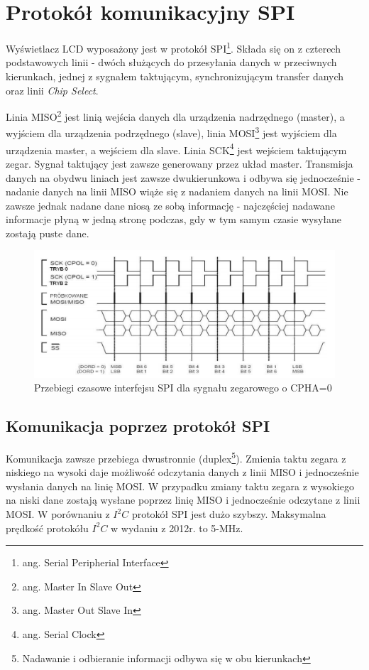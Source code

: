 \documentclass{xmgr}
\begin{document}
\section{Protokół komunikacyjny SPI}
Wyświetlacz LCD wyposażony jest w protokół SPI\footnote{ang. Serial Peripherial Interface}. Składa się on z czterech podstawowych linii - dwóch służących do przesyłania danych w przeciwnych kierunkach, jednej z sygnałem taktującym, synchronizującym transfer danych oraz linii \emph{Chip Select}. 

Linia MISO\footnote{ang. Master In Slave Out} jest linią wejścia danych dla urządzenia nadrzędnego (master), a wyjściem dla urządzenia podrzędnego (slave), linia MOSI\footnote{ang. Master Out Slave In} jest wyjściem dla urządzenia master, a wejściem dla slave. Linia SCK\footnote{ang. Serial Clock} jest wejściem taktującym zegar. Sygnał taktujący jest zawsze generowany przez układ master. Transmisja danych na obydwu liniach jest zawsze dwukierunkowa i odbywa się jednocześnie - nadanie danych na linii MISO wiąże się z nadaniem danych na linii MOSI. Nie zawsze jednak nadane dane niosą ze sobą informację - najczęściej nadawane informacje płyną w jedną stronę podczas, gdy w tym samym czasie wysyłane zostają puste dane.\cite{Dorra}

\begin{figure}[!h]
    \centering
    \includegraphics[height=0.25\textheight]{images/spi.png}
    \caption{Przebiegi czasowe interfejsu SPI dla sygnału zegarowego o CPHA=0}
\end{figure}

\subsection{Komunikacja poprzez protokół SPI}
Komunikacja zawsze przebiega dwustronnie (duplex\footnote{Nadawanie i odbieranie informacji odbywa się w obu kierunkach}). Zmienia taktu zegara z niskiego na wysoki daje możliwość odczytania danych z linii MISO i jednocześnie wysłania danych na linię MOSI. W przypadku zmiany taktu zegara z wysokiego na niski dane zostają wysłane poprzez linię MISO i jednocześnie odczytane z linii MOSI. W porównaniu z $I^2C$ protokół SPI jest dużo szybszy. Maksymalna prędkość protokółu $I^2C$ w wydaniu z 2012r. to 5-MHz.
\end{document}
